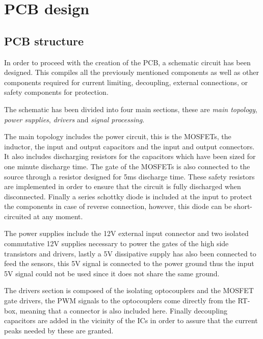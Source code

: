 \section{PCB design}
\subsection{PCB structure} \label{PCB_Schematic}
In order to proceed with the creation of the PCB, a schematic circuit has been designed. This compiles all the previously mentioned components as well as other components required for current limiting, decoupling, external connections, or safety components for protection.

The schematic has been divided into four main sections, these are \textit{main topology}, \textit{power supplies}, \textit{drivers} and \textit{signal processing}.

The main topology includes the power circuit, this is the MOSFETs, the inductor, the input and output capacitors and the input and output connectors. It also includes discharging resistors for the capacitors which have been sized for one minute discharge time. The gate of the MOSFETs is also connected to the source through a resistor designed for 5ms discharge time. These safety resistors are implemented in order to ensure that the circuit is fully discharged when disconnected. Finally a series schottky diode is included at the input to protect the components in case of reverse connection, however, this diode can be short-circuited at any moment. 

The power supplies include the 12V external input connector and two isolated commutative 12V supplies necessary to power the gates of the high side transistors and drivers, lastly a 5V dissipative supply has also been connected to feed the sensors, this 5V signal is connected to the power ground thus the input 5V signal could not be used since it does not share the same ground.

The drivers section is composed of the isolating optocouplers and the MOSFET gate drivers, the PWM signals to the optocouplers come directly from the RT-box, meaning that a connector is also included here. Finally decoupling capacitors are added in the vicinity of the ICs  in order to assure that the current peaks needed by these are granted. 

